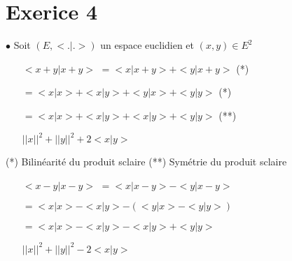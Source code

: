 \documentclass{article}
\author{Frederic Becerril}
\begin{document}
\part*{Exerice 4}

$\bullet$ Soit $(E, <.|.>)$ un espace euclidien et $(x, y) \in E^2$\\
\begin{center}
    \begin{minipage}{0.75\textwidth}    
        \begin{itemize}
            \item[$<x + y | x + y>$] $= <x | x + y> + <y | x + y>$ (*)
            \item[] $=<x | x> + <x | y> + <y | x> + <y | y>$ (*)
            \item[] $=<x | x> + <x | y> + <x | y> + <y | y>$ (**) 
            \item[] $||x||^2 + ||y||^2 + 2 <x|y>$
        \end{itemize}
    \end{minipage}
\end{center}
(*) Bilinéarité du produit sclaire
(**) Symétrie du produit sclaire

\begin{center}
    \begin{minipage}{0.75\textwidth}    
        \begin{itemize}
            \item[$<x - y | x - y>$] $= <x | x - y> - <y | x - y>$
            \item[] $=<x | x> - <x | y> - (<y | x> - <y | y>)$
            \item[] $=<x | x> - <x | y> - <x | y> + <y | y>$ 
            \item[] $||x||^2 + ||y||^2 - 2 <x|y>$
        \end{itemize}
    \end{minipage}
\end{center}
\end{document}

